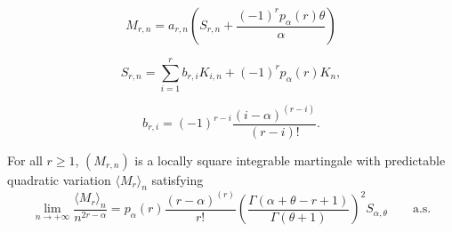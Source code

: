 \documentclass[10pt,a4paper]{amsart}
\begin{document}
\begin{equation}
\label{DEFMr}
M_{r,n}=a_{r,n}\left(S_{r,n}+ \frac{(-1)^{r} p_{\alpha}(r) \theta}{\alpha}\right)
\end{equation}

\begin{equation}
\label{DEFSNr}
S_{r,n}= \sum_{i=1}^{r}b_{r,i}K_{i,n}+(-1)^r p_{\alpha}(r) K_{n},
\end{equation}

\begin{equation}
\label{DEFbr}
b_{r,i}=(-1)^{r-i}\frac{(i-\alpha)^{(r-i)}}{(r-i)!}.
\end{equation}

\begin{lem}
\label{L-KEY}
For all $r \geq 1$, $(M_{r,n})$ is a locally square integrable martingale with predictable quadratic variation $\langle M_r \rangle_{n}$ satisfying
\begin{equation}
\label{LIMIPINMr}
\lim_{n\rightarrow+\infty}\frac{\langle M_{r}\rangle_{n}}{n^{2r-\alpha}}=p_{\alpha}(r)\frac{(r-\alpha)^{(r)}}{r!}\left(\frac{\Gamma(\alpha+\theta-r+1)}{\Gamma(\theta+1)}\right)^{2}S_{\alpha,\theta}\qquad\text{a.s.}
\end{equation}
\end{lem}
\end{document}
